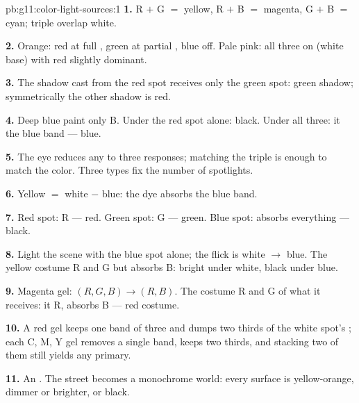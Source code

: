 \begin{solution}{pb:g11:color-light-sources:1}
\textbf{1.} R $+$ G $=$ yellow, R $+$ B $=$ magenta, G $+$ B $=$ cyan;
triple overlap white.

\textbf{2.} Orange: red at full , green at partial , blue
off. Pale pink: all three on (white base) with red slightly dominant.

\textbf{3.} The shadow cast from the red spot receives only the green
spot: green shadow; symmetrically the other shadow is red.

\textbf{4.} Deep blue paint  only B. Under the red spot alone:
black. Under all three: it  the blue band --- blue.

\textbf{5.} The eye reduces any  to three  responses;
matching the triple is enough to match the color. Three  types fix
the number of spotlights.

\textbf{6.} Yellow $=$ white $-$ blue: the dye absorbs the blue band.

\textbf{7.} Red spot:  R --- red. Green spot:  G ---
green. Blue spot: absorbs everything --- black.

\textbf{8.} Light the scene with the blue spot alone; the flick is
white $\to$ blue. The yellow costume  R and G but absorbs B:
bright under white, black under blue.

\textbf{9.} Magenta gel: $(R, G, B) \to (R, B)$. The costume 
R and G of what it receives: it  R, absorbs B --- red costume.

\textbf{10.} A red gel keeps one band of three and dumps two thirds of
the white spot's ; each C, M, Y gel removes a single band, keeps
two thirds, and stacking two of them still yields any primary.

\textbf{11.} An . The street becomes a monochrome
world: every surface is yellow-orange, dimmer or brighter, or black.


\end{solution}
